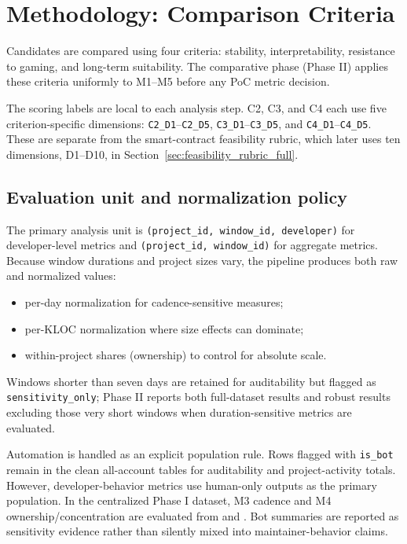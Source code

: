 \section{Methodology: Comparison Criteria}
\label{sec:methodology_criteria}

Candidates are compared using four criteria: stability, interpretability, resistance to gaming, and long-term suitability.
The comparative phase (Phase II) applies these criteria uniformly to M1--M5 before any PoC metric decision.

The scoring labels are local to each analysis step. C2, C3, and C4 each use five criterion-specific dimensions:
\texttt{C2\_D1}--\texttt{C2\_D5}, \texttt{C3\_D1}--\texttt{C3\_D5}, and
\texttt{C4\_D1}--\texttt{C4\_D5}. These are separate from the smart-contract feasibility rubric, which later uses
ten dimensions, D1--D10, in Section~\ref{sec:feasibility_rubric_full}.

\subsection{Evaluation unit and normalization policy}
\label{sec:evaluation_unit}

The primary analysis unit is \texttt{(project\_id, window\_id, developer)} for developer-level metrics and
\texttt{(project\_id, window\_id)} for aggregate metrics. Because window durations and project sizes vary, the pipeline
produces both raw and normalized values:
\begin{itemize}[leftmargin=*]
  \item per-day normalization for cadence-sensitive measures;
  \item per-KLOC normalization where size effects can dominate;
  \item within-project shares (ownership) to control for absolute scale.
\end{itemize}
Windows shorter than seven days are retained for auditability but flagged as \texttt{sensitivity\_only}; Phase II reports
both full-dataset results and robust results excluding those very short windows when duration-sensitive metrics are evaluated.

Automation is handled as an explicit population rule. Rows flagged with \texttt{is\_bot} remain in the clean all-account
tables for auditability and project-activity totals. However, developer-behavior metrics use human-only outputs as the
primary population. In the centralized Phase I dataset, M3 cadence and M4 ownership/concentration are evaluated from
 and . Bot summaries are reported
as sensitivity evidence rather than silently mixed into maintainer-behavior claims.

